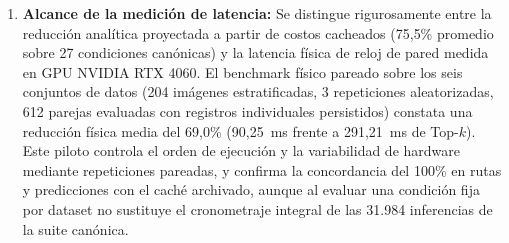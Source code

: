 \begin{enumerate}
\item \textbf{Alcance de la medición de latencia:} Se distingue rigurosamente entre la reducción analítica proyectada a partir de costos cacheados (75{,}5\% promedio sobre 27 condiciones canónicas) y la latencia física de reloj de pared medida en GPU NVIDIA RTX 4060. El benchmark físico pareado sobre los seis conjuntos de datos (204 imágenes estratificadas, 3 repeticiones aleatorizadas, 612 parejas evaluadas con registros individuales persistidos) constata una reducción física media del 69{,}0\% (90{,}25~ms frente a 291{,}21~ms de Top-$k$). Este piloto controla el orden de ejecución y la variabilidad de hardware mediante repeticiones pareadas, y confirma la concordancia del 100\% en rutas y predicciones con el caché archivado, aunque al evaluar una condición fija por dataset no sustituye el cronometraje integral de las 31.984 inferencias de la suite canónica.
\end{enumerate}

